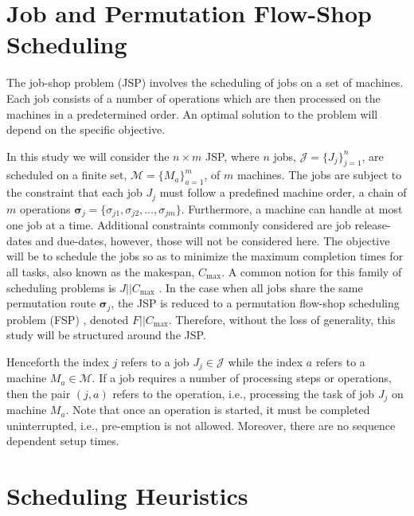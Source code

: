 \documentclass[smallextended]{svjour3}
\renewcommand{\vsigma}{\bm \sigma}
\begin{document}
\section{Job and Permutation Flow-Shop
  Scheduling}\label{sec:problemdef}
The job-shop problem (JSP) involves the scheduling of jobs on a set of
machines. Each job consists of a number of operations which are then
processed on the machines in a predetermined order. An optimal
solution to the problem will depend on the specific objective.
	
In this study we will consider the $n\times m$ JSP, where $n$ jobs,
$\mathcal{J}=\{J_j\}_{j=1}^n$, are scheduled on a finite set,
$\mathcal{M}=\{M_a\}_{a=1}^m$, of $m$ machines. The jobs are subject
to the constraint that each job $J_j$ must follow a predefined machine
order, a chain of $m$ operations
$\vsigma_j=\{\sigma_{j1},\sigma_{j2},\dotsc,\sigma_{jm}\}$. Furthermore,
a machine can handle at most one job at a time. Additional constraints
commonly considered are job release-dates and due-dates, however,
those will not be considered here.  The objective will be to schedule
the jobs so as to minimize the maximum completion times for all tasks,
also known as the makespan, $C_{\max}$. A common notion for this
family of scheduling problems is $J||C_{\max}$ \citep{Pinedo08}.  In the
case when all jobs share the same permutation route $\vsigma_j$, the
JSP is reduced to a permutation flow-shop scheduling problem (FSP)
\citep{Guinet1998,Tay08}, denoted $F||C_{\max}$. Therefore, without
the loss of generality, this study will be structured around the JSP.
		
Henceforth the index $j$ refers to a job $J_j\in\mathcal{J}$ while the
index $a$ refers to a machine $M_a\in\mathcal{M}$. If a job requires a
number of processing steps or operations, then the pair $(j,a)$ refers
to the operation, i.e., processing the task of job $J_j$ on machine
$M_a$. Note that once an operation is started, it must be completed
uninterrupted, i.e., pre-emption is not allowed. Moreover, there are
no sequence dependent setup times.
		
	
	

\section{Scheduling Heuristics} \label{sec:constructionjssp}
	
\end{document}
